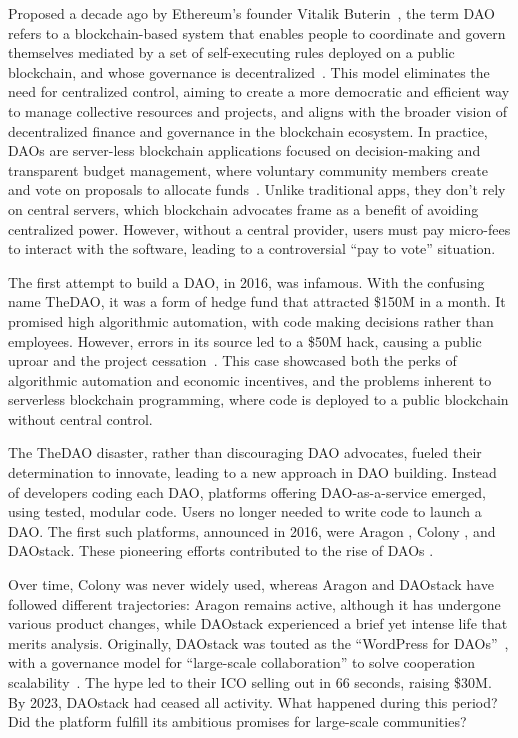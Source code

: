 \documentclass[10pt,lineno]{wlpeerj}
\begin{document}

Proposed a decade ago by Ethereum’s founder Vitalik Buterin~\citep{Buterin_2014}, the term DAO refers to a blockchain-based system that enables people to coordinate and govern themselves mediated by a set of self-executing rules deployed on a public blockchain, and whose governance is decentralized~\citep{Hassan2021}. This model eliminates the need for centralized control, aiming to create a more democratic and efficient way to manage collective resources and projects, and aligns with the broader vision of decentralized finance and governance in the blockchain ecosystem. In practice, DAOs are server-less blockchain applications focused on decision-making and transparent budget management, where voluntary community members create and vote on proposals to allocate funds~\citep{Lustenberger2024,ellinger2023skin}. Unlike traditional apps, they don’t rely on central servers, which blockchain advocates frame as a benefit of avoiding centralized power. However, without a central provider, users must pay micro-fees to interact with the software, leading to a controversial “pay to vote” situation.
 
The first attempt to build a DAO, in 2016, was infamous. With the confusing name TheDAO, it was a form of hedge fund that attracted \$150M in a month. It promised high algorithmic automation, with code making decisions rather than employees. However, errors in its source led to a \$50M hack, causing a public uproar and the project cessation~\citep{Peck_2016,dupont2017experiments}. This case showcased both the perks of algorithmic automation and economic incentives, and the problems inherent to serverless blockchain programming, where code is deployed to a public blockchain without central control. 

The TheDAO disaster, rather than discouraging DAO advocates, fueled their determination to innovate, leading to a new approach in DAO building. Instead of developers coding each DAO, platforms offering DAO-as-a-service emerged, using tested, modular code. Users no longer needed to write code to launch a DAO. The first such platforms, announced in 2016, were Aragon \citep{Pena_2023}, Colony \citep{mannan2018fostering}, and DAOstack. These pioneering efforts contributed to the rise of DAOs \citep{Bellavitis2023}.

Over time, Colony was never widely used, whereas Aragon and DAOstack have followed different trajectories: Aragon remains active, although it has undergone various product changes, while DAOstack experienced a brief yet intense life that merits analysis. Originally, DAOstack was touted as the ``WordPress for DAOs''~\citep{DAOstackWhitepaper1.0}, with a governance model for ``large-scale collaboration'' to solve cooperation scalability~\citep{Field_2018}. The hype led to their ICO selling out in 66 seconds, raising \$30M. By 2023, DAOstack had ceased all activity. What happened during this period? Did the platform fulfill its ambitious promises for large-scale communities?
\end{document}
